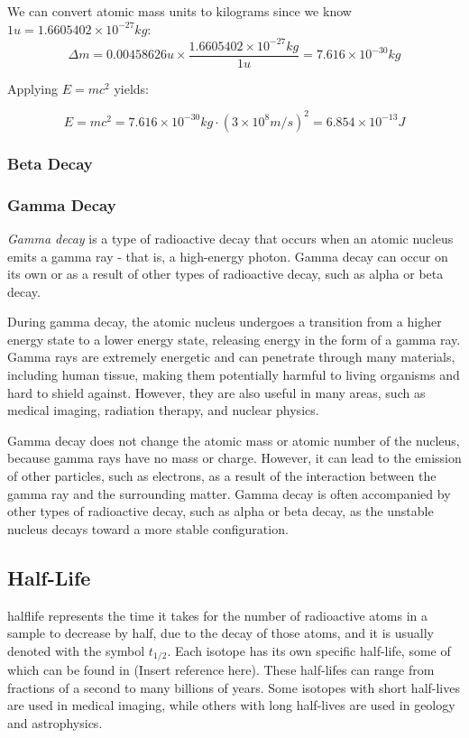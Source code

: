 \begin{mdframed}[backgroundcolor=blue!10!white]
We can convert atomic mass units to kilograms since we know $1 \si{u} = 1.6605402 \times 10^{-27} \si{kg}$:
\begin{equation*}
\Delta m =  0.00458626 \si{u} \times \frac{1.6605402 \times 10^{-27} \si{kg}}{1\si{u}} = 7.616 \times 10^{-30} \si{kg}
\end{equation*}

Applying $E = mc^2$ yields:

\begin{equation}
E = m c ^2 = 7.616 \times 10^{-30} \si{kg} \cdot (3 \times 10^8 \si{m/s})^2  = \boxed{6.854\times 10^{-13} \si{J}}
\end{equation}
	
\end{mdframed}




\subsubsection{Beta Decay}
\subsubsection{Gamma Decay}
\textit{Gamma decay} is a type of radioactive decay that occurs when an atomic nucleus emits a gamma ray - that is, a high-energy photon.  Gamma decay can occur on its own or as a result of other types of radioactive decay, such as alpha or beta decay.

During gamma decay, the atomic nucleus undergoes a transition from a higher energy state to a lower energy state, releasing energy in the form of a gamma ray. Gamma rays are extremely energetic and can penetrate through many materials, including human tissue, making them potentially harmful to living organisms and hard to shield against.  However, they are also useful in many areas, such as medical imaging, radiation therapy, and nuclear physics.

Gamma decay does not change the atomic mass or atomic number of the nucleus, because gamma rays have no mass or charge. However, it can lead to the emission of other particles, such as electrons, as a result of the interaction between the gamma ray and the surrounding matter. Gamma decay is often accompanied by other types of radioactive decay, such as alpha or beta decay, as the unstable nucleus decays toward a more stable configuration.


\subsection{Half-Life}
\gls{halflife} represents the time it takes for the number of radioactive atoms in a sample to decrease by half, due to the decay of those atoms, and it is usually denoted with the symbol $t_{1/2}$.  Each isotope has its own specific half-life, some of which can be found in (Insert reference here).  These half-lifes can range from fractions of a second to many billions of years.  Some isotopes with short half-lives are used in medical imaging, while others with long half-lives are used in geology and astrophysics.

